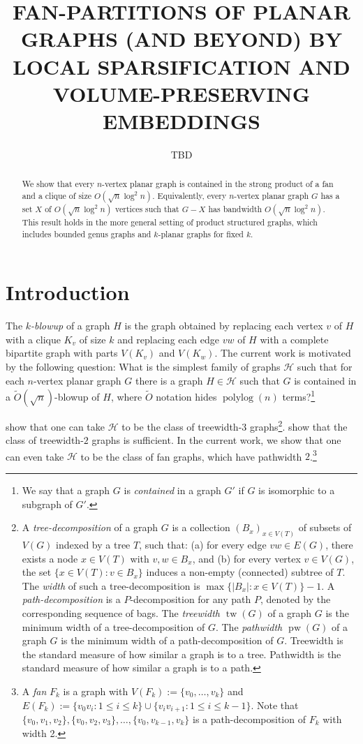 \documentclass{patmorin}
\title{\MakeUppercase{Fan-Partitions of Planar Graphs (and Beyond)
  \newline by Local Sparsification and Volume-Preserving Embeddings}}
\author{TBD}
\date{}
\renewcommand{\leq}{\leqslant}
\newcommand{\defin}[1]{\emph{\textcolor{brightmaroon}{#1}}}
\DeclareMathOperator{\tw}{tw}
\DeclareMathOperator{\pw}{pw}
\DeclareMathOperator{\polylog}{polylog}
\begin{document}
\maketitle

\begin{abstract}
  We show that every $n$-vertex planar graph is contained in the strong product of a fan and a clique of size $O(\sqrt{n}\log^2 n)$.  Equivalently, every $n$-vertex planar graph $G$ has a set $X$ of $O(\sqrt{n}\log^2 n)$ vertices such that $G-X$ has bandwidth $O(\sqrt{n}\log^2 n)$.  This result holds in the more general setting of product structured graphs, which includes bounded genus graphs and $k$-planar graphs for fixed $k$.
\end{abstract}

\section{Introduction}


The \defin{$k$-blowup} of a graph $H$ is the graph obtained by replacing each vertex $v$ of $H$ with a clique $K_v$ of size $k$ and replacing each edge $vw$ of $H$ with a complete bipartite graph with parts $V(K_v)$ and $V(K_w)$.  The current work is motivated by the following question: What is the simplest family of graphs $\mathcal{H}$ such that for each $n$-vertex planar graph $G$ there is a graph $H\in\mathcal{H}$ such that $G$ is contained in a $\tilde{O}(\sqrt{n})$-blowup of $H$, where $\tilde{O}$ notation hides $\polylog(n)$ terms?\footnote{We say that a graph $G$ is \defin{contained} in a graph $G'$ if $G$ is isomorphic to a subgraph of $G'$.}

\citet{ISW} show that one can take $\mathcal{H}$ to be the class of treewidth-$3$ graphs\footnote{A \defin{tree-decomposition} of a graph $G$ is a collection $(B_x)_{x \in V(T)}$ of subsets of $V(G)$ indexed by a tree $T$, such that: (a) for every edge ${vw \in E(G)}$, there exists a node ${x \in V(T)}$ with ${v,w \in B_x}$, and (b) for every vertex ${v \in V(G)}$, the set $\{ x \in V(T) \colon v \in B_x \}$ induces a non-empty (connected) subtree of $T$. The \defin{width} of such a tree-decomposition is ${\max\{ |B_x| \colon x \in V(T) \}-1}$. A \defin{path-decomposition} is a $P$-decomposition for any path $P$, denoted by the corresponding sequence of bags.
The \defin{treewidth $\tw(G)$} of a graph $G$ is the minimum width of a tree-decomposition of $G$.
The \defin{pathwidth $\pw(G)$} of a graph $G$ is the minimum width of a path-decomposition of $G$.
Treewidth is the standard measure of how similar a graph is to a tree.
Pathwidth is the standard measure of how similar a graph is to a path.}. \citet{distel.dujmovic.ea:product} show that the class of treewidth-$2$ graphs is sufficient.  In the current work, we show that one can even take $\mathcal{H}$ to be the class of fan graphs, which have pathwidth $2$.\footnote{A \defin{fan} $F_k$ is a graph with $V(F_k):=\{v_0,\ldots,v_k\}$ and $E(F_k):=\{v_0v_i:1\leq i\leq k\}\cup\{v_iv_{i+1}:1\leq i\leq k-1\}$. Note that $\{v_0,v_1,v_2\},\{v_0,v_2,v_3\},\dots,\{v_0,v_{k-1},v_k\}$ is a path-decomposition of $F_k$ with width 2.}
\end{document}

